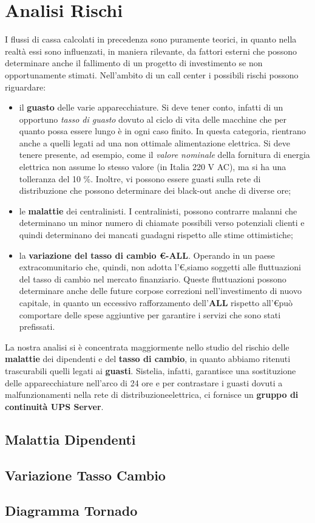 \chapter[Analisi Rischi]{Analisi Rischi}
I flussi di cassa calcolati in precedenza sono puramente teorici, in quanto nella realtà essi sono influenzati, in maniera rilevante, da fattori esterni che possono determinare anche il fallimento di un progetto di investimento se non opportunamente stimati.
Nell'ambito di un call center i possibili rischi possono riguardare:
\begin{itemize}
\item il \textbf{guasto} delle varie apparecchiature. Si deve tener conto, infatti di un opportuno \textit{tasso di guasto} dovuto al ciclo di vita delle macchine che per quanto possa essere lungo è in ogni caso finito. In questa categoria, rientrano anche a quelli legati ad una non ottimale alimentazione elettrica. Si deve tenere presente, ad esempio, come il \textit{valore nominale} della fornitura di energia elettrica non assume lo stesso valore (in Italia 220 V AC), ma si ha una tolleranza del 10 \%\cite{norma_cei}. Inoltre, vi possono essere guasti sulla rete di distribuzione che possono determinare dei black-out anche di diverse ore;
\item le \textbf{malattie} dei centralinisti. I centralinisti, possono contrarre malanni che determinano un minor numero di chiamate possibili verso potenziali clienti e quindi determinano dei mancati guadagni rispetto alle stime ottimistiche;
\item la \textbf{variazione del tasso di cambio \euro -ALL}. Operando in un paese extracomunitario che, quindi, non adotta l'\euro ,siamo soggetti alle fluttuazioni del tasso di cambio nel mercato finanziario. Queste fluttuazioni possono determinare anche delle future corpose correzioni nell'investimento di nuovo capitale, in quanto un eccessivo rafforzamento dell'\textbf{ALL} rispetto all'\euro può comportare delle spese aggiuntive per garantire i servizi che sono stati prefissati.  
\end{itemize} 
La nostra analisi si è concentrata maggiormente nello studio del rischio delle \textbf{malattie} dei dipendenti e del \textbf{tasso di cambio}, in quanto abbiamo ritenuti trascurabili quelli legati ai \textbf{guasti}. Sistelia, infatti, garantisce una sostituzione delle apparecchiature nell'arco di 24 ore e per contrastare i guasti dovuti a malfunzionamenti nella rete di distribuzioneelettrica, ci fornisce un \textbf{gruppo di continuità \ac{UPS} Server}.

\section[Malattia Dipendenti]{Malattia Dipendenti}
	

\section[Variazione Tasso Cambio]{Variazione Tasso Cambio}
	
	
\section[Diagramma Tornado]{Diagramma Tornado}	
	